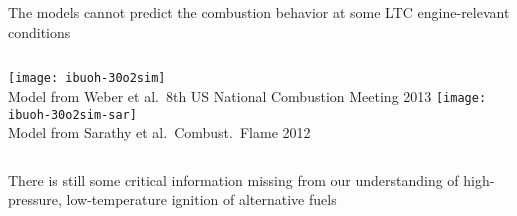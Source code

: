 \documentclass{beamer}
\begin{document}
\begin{frame}{The models cannot predict the combustion behavior at some LTC engine-relevant conditions}
    \begin{columns}
            \centering
            \texttt{[image: ibuoh-30o2sim]}\\
            Model from Weber et al.\ 8th US National Combustion Meeting 2013
            \centering
            \texttt{[image: ibuoh-30o2sim-sar]}\\
            Model from Sarathy et al.\ Combust.\ Flame 2012
    \end{columns}
    \vspace{0.5cm}
    \begin{center}
        There is still some critical information missing from our
        understanding of high-pressure, low-temperature ignition
        of alternative fuels
    \end{center}
\end{frame}
\end{document}
